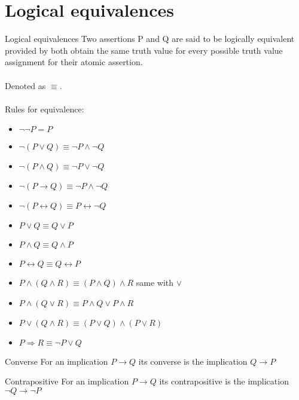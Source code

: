 \documentclass[../MATH-2000-Notes.tex]{subfiles}
\begin{document}
\section{Logical equivalences}
\begin{Definition}
    {Logical equivalences}
    Two assertions P and Q are said to be logically equivalent provided by both obtain the same truth value for every possible truth value assignment for their atomic assertion.
    \\~\\
    Denoted as \(\equiv\).
    \\~\\
    Rules for equivalence:
    \begin{itemize}
        \item \(\neg \neg P = P\)
        \item \(\neg (P\vee Q) \equiv \neg P \wedge \neg Q\)
        \item \(\neg (P\wedge Q) \equiv \neg P \vee \neg Q\)
        \item \(\neg (P \rightarrow Q) \equiv \neg P \wedge \neg Q\)
        \item \(\neg (P\leftrightarrow Q) \equiv P \leftrightarrow \neg Q \)
        \item \(P \vee Q \equiv Q \vee P\)
        \item \(P \wedge Q \equiv Q \wedge P\)
        \item \(P \leftrightarrow Q \equiv Q \leftrightarrow P\)
        \item \(P\wedge (Q \wedge R) \equiv (P \wedge Q) \wedge R\) same with \(\vee\)
        \item \(P\wedge (Q \vee R) \equiv P\wedge Q \vee P \wedge R\)
        \item \(P \vee (Q \wedge R) \equiv (P \vee Q) \wedge (P\vee R)\)
        \item \(P \Rightarrow R \equiv \neg P \vee Q\)
    \end{itemize}
\end{Definition}
\begin{Definition}
    {Converse}
    For an implication \(P\rightarrow Q\) its converse is the implication \(Q\rightarrow P\)
\end{Definition}
\begin{Definition}
    {Contrapositive}
    For an implication \(P \rightarrow Q\) its  contrapositive is the implication \(\neg Q \rightarrow \neg P\)
\end{Definition}
\end{document}
